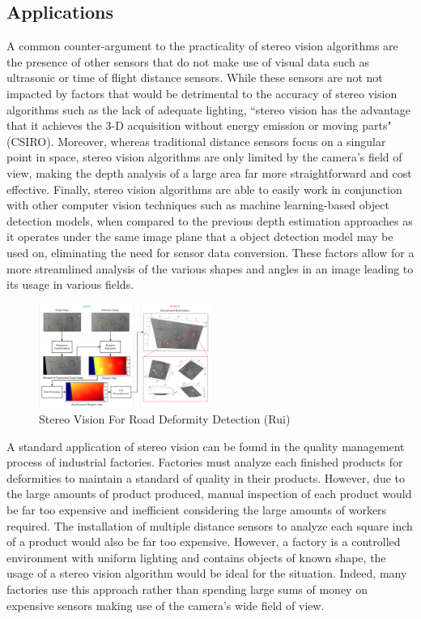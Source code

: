 \documentclass[11pt]{scrartcl}
\begin{document}
\subsection{Applications}
A common counter-argument to the practicality of stereo vision algorithms are the presence of other sensors that do not make use of visual data such
as ultrasonic or time of flight distance sensors. While these sensors are not
not impacted by factors that would be detrimental to the accuracy of stereo
vision algorithms such as the lack of adequate lighting,
``stereo vision has the advantage that it achieves the 3-D acquisition without
energy emission or moving parts" (CSIRO). Moreover,
whereas traditional distance sensors focus on a singular point in space, stereo vision
algorithms are only limited by the camera's field of view, making the depth analysis
of a large area far more straightforward and cost effective. Finally, stereo vision algorithms are able
to easily work in conjunction with other
computer vision techniques such as machine learning-based object detection
models, when compared to the previous depth estimation approaches as it operates under the same image plane that a object detection model may be used on, eliminating the need for sensor data conversion.
These factors allow for a more streamlined analysis of the
various shapes and angles in an image leading to its usage in various fields.
\\
\begin{figure}
	\centering
	\includegraphics[width=0.5\textwidth]{img1.png}
	\caption{\label{fig:frog1}Stereo Vision For Road Deformity Detection (Rui)}
\end{figure}

A standard application of stereo vision can be found in the quality
management process of industrial factories. Factories must analyze each
finished products for deformities to maintain a standard of quality in their
products. However, due to the large amounts of product produced, 
manual inspection of each product would be far too expensive and inefficient considering the large amounts of workers required. The installation of multiple
distance sensors to analyze each square inch of a product would also be far too expensive.
However, a factory is a controlled environment with uniform lighting and contains objects
of known shape, the usage of a stereo vision algorithm would be ideal for the situation. Indeed, many factories use this approach rather than spending large sums of money on expensive sensors making use of the camera's wide field of view. 
\\
\end{document}

